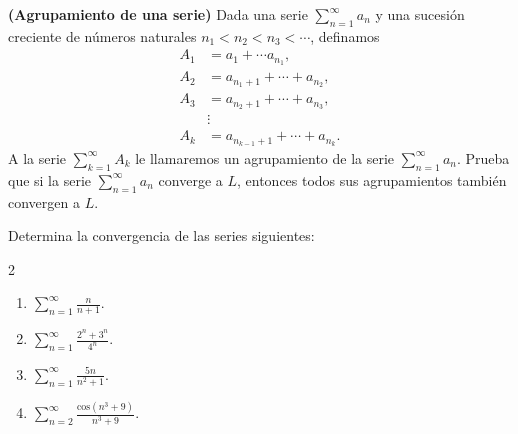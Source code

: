 \documentclass[12pt,a4paper]{article}
\begin{document}
    \begin{mdframed}[style=mdpinkbox,frametitle={Ejercicio 3}]
        \textbf{(Agrupamiento de una serie)} Dada una serie $\sum_{n=1}^{\infty}a_{n}$ y una sucesión
        creciente de números naturales $n_{1}\lt n_{2}\lt n_{3}\lt\cdots$, definamos
        \begin{align*}
            A_{1} & =a_{1}+\cdots a_{n_{1}},\\
            A_{2} & =a_{n_{1}+1}+\cdots+a_{n_{2}},\\
            A_{3} & =a_{n_{2}+1}+\cdots+a_{n_{3}},\\
            & \vdots\\
            A_{k} & =a_{n_{k-1}+1}+\cdots+a_{n_{k}}.
        \end{align*}
        A la serie $\sum_{k=1}^{\infty}A_{k}$ le llamaremos un agrupamiento de la serie $\sum_{n=1}^{\infty}a_{n}$.
        Prueba que si la serie $\sum_{n=1}^{\infty}a_{n}$ converge a $L$, entonces todos sus agrupamientos también
        convergen a $L$.
    \end{mdframed}

    \begin{mdframed}[style=mdpinkbox,frametitle={Ejercicio 4}]
        Determina la convergencia de las series siguientes:
        \begin{multicols}{2}
            \begin{enumerate}
                \item[(a)]  $\sum_{n=1}^{\infty}$$\frac{n}{n+1}$.
                \item[(b)]  $\sum_{n=1}^{\infty}\frac{2^{n}+3^{n}}{4^{n}}.$
                \item[(c)]  $\sum_{n=1}^{\infty}\frac{5n}{n^{2}+1}.$
                \item[(d)]  $\sum_{n=2}^{\infty}\frac{\text{cos}\left(n^{3}+9\right)}{n^{3}+9}.$
            \end{enumerate}
        \end{multicols}
    \end{mdframed}
\end{document}
